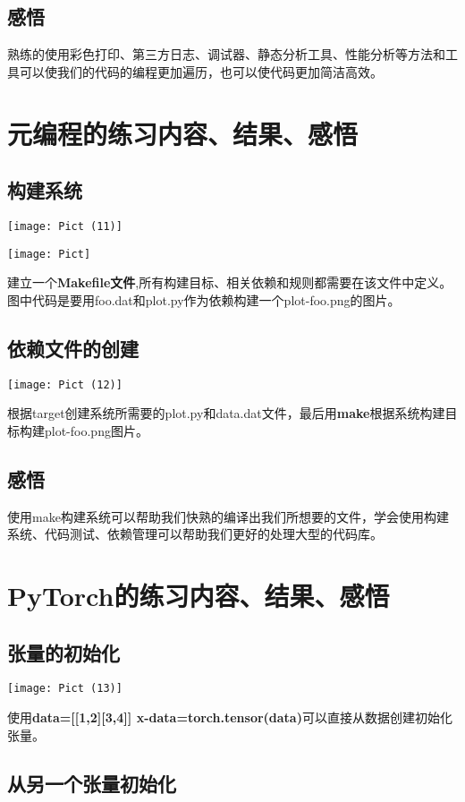 \documentclass[a4paper, 12pt]{article}
\begin{document}
\subsection{\small 感悟}

熟练的使用彩色打印、第三方日志、调试器、静态分析工具、性能分析等方法和工具可以使我们的代码的编程更加遍历，也可以使代码更加简洁高效。

\section{\large 元编程的练习内容、结果、感悟}
\subsection{\small 构建系统}

\texttt{[image: Pict (11)]}

\texttt{[image: Pict]}

建立一个\textbf{Makefile文件},所有构建目标、相关依赖和规则都需要在该文件中定义。图中代码是要用foo.dat和plot.py作为依赖构建一个plot-foo.png的图片。

\subsection{\small 依赖文件的创建}
\texttt{[image: Pict (12)]}

根据target创建系统所需要的plot.py和data.dat文件，最后用\textbf{make}根据系统构建目标构建plot-foo.png图片。

\subsection{\small 感悟}

使用make构建系统可以帮助我们快熟的编译出我们所想要的文件，学会使用构建系统、代码测试、依赖管理可以帮助我们更好的处理大型的代码库。
\section{\large PyTorch的练习内容、结果、感悟}
\subsection{\small 张量的初始化}
\texttt{[image: Pict (13)]}

使用\textbf{data=[[1,2][3,4]]  x-data=torch.tensor(data)}可以直接从数据创建初始化张量。
\subsection{\small 从另一个张量初始化}
\end{document}
